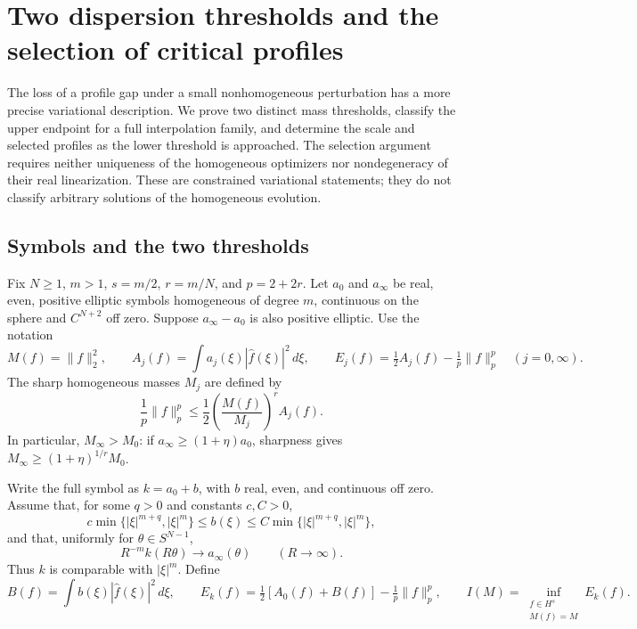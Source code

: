 \section{Two dispersion thresholds and the selection of critical profiles}
\label{sec:r10-symbols}

The loss of a profile gap under a small nonhomogeneous perturbation has a
more precise variational description.  We prove two distinct mass
thresholds, classify the upper endpoint for a full interpolation family,
and determine the scale and selected profiles as the lower threshold is
approached.  The selection argument requires neither uniqueness of the
homogeneous optimizers nor nondegeneracy of their real linearization.
These are constrained variational statements; they do not classify
arbitrary solutions of the homogeneous evolution.

\subsection{Symbols and the two thresholds}

Fix $N\ge1$, $m>1$, $s=m/2$, $r=m/N$, and $p=2+2r$.  Let $a_0$ and
$a_\infty$ be real, even, positive elliptic symbols homogeneous of degree
$m$, continuous on the sphere and $C^{N+2}$ off zero.  Suppose
$a_\infty-a_0$ is also positive elliptic.  Use the notation
\[
 M(f)=\|f\|_2^2,\qquad A_j(f)=\int a_j(\xi)|\widehat f(\xi)|^2\,d\xi,
 \qquad E_j(f)=\tfrac12 A_j(f)-\tfrac1p\|f\|_p^p
 \quad(j=0,\infty).
\]
The sharp homogeneous masses $M_j$ are defined by
\begin{equation}\label{eq:r10-sharp-gn}
 \frac1p\|f\|_p^p\le
 \frac12\left(\frac{M(f)}{M_j}\right)^r A_j(f).
\end{equation}
In particular, $M_\infty>M_0$: if
$a_\infty\ge(1+\eta)a_0$, sharpness gives
$M_\infty\ge(1+\eta)^{1/r}M_0$.

Write the full symbol as $k=a_0+b$, with $b$ real, even, and continuous
off zero.  Assume that, for some $q>0$ and constants $c,C>0$,
\begin{equation}\label{eq:r10-bounds}
 c\min\{|\xi|^{m+q},|\xi|^m\}
 \le b(\xi)\le C\min\{|\xi|^{m+q},|\xi|^m\},
\end{equation}
and that, uniformly for $\theta\in S^{N-1}$,
\begin{equation}\label{eq:r10-high-limit}
 R^{-m}k(R\theta)\longrightarrow a_\infty(\theta)
 \qquad(R\longrightarrow\infty).
\end{equation}
Thus $k$ is comparable with $|\xi|^m$.  Define
\[
 B(f)=\int b(\xi)|\widehat f(\xi)|^2\,d\xi,\qquad
 E_k(f)=\tfrac12[A_0(f)+B(f)]-\tfrac1p\|f\|_p^p,
 \qquad I(M)=\inf_{\substack{f\in H^s\\M(f)=M}}E_k(f).
\]

